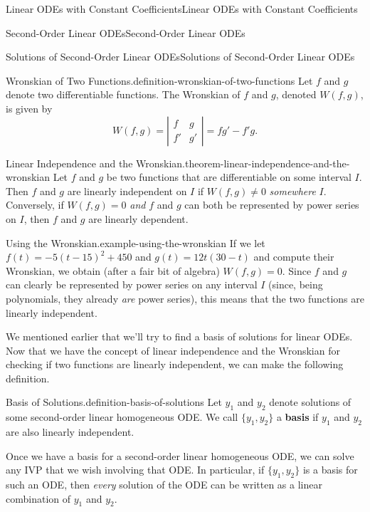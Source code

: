 \documentclass[10pt,]{book}
\newcommand{\terminology}[1]{\textbf{#1}}
\numberwithin{equation}{section}
\newcommand{\amp}{&}
\begin{document}
\begin{chapterptx}{Linear ODEs with Constant Coefficients}{}{Linear ODEs with Constant Coefficients}{}{}
\begin{sectionptx}{Second-Order Linear ODEs}{}{Second-Order Linear ODEs}{}{}
\begin{subsectionptx}{Solutions of Second-Order Linear ODEs}{}{Solutions of Second-Order Linear ODEs}{}{}
\begin{definition}{Wronskian of Two Functions.}{definition-wronskian-of-two-functions}%
\hypertarget{p-169}{}%
Let \(f\) and \(g\) denote two differentiable functions. The Wronskian of \(f\) and \(g\), denoted \(W(f,g)\), is given by%
\begin{equation*}
W(f,g) = \left|\begin{matrix} f \amp g \\ f' \amp g' \end{matrix}\right| = fg' - f'g.
\end{equation*}
%
\end{definition}
\begin{theorem}{Linear Independence and the Wronskian.}{}{theorem-linear-independence-and-the-wronskian}%
\hypertarget{p-170}{}%
Let \(f\) and \(g\) be two functions that are differentiable on some interval \(I\). Then \(f\) and \(g\) are linearly independent on \(I\) if \(W(f,g) \neq 0\) \emph{somewhere} \(I\). Conversely, if \(W(f,g) = 0\) \emph{and} \(f\) and \(g\) can both be represented by power series on \(I\), then \(f\) and \(g\) are linearly dependent.%
\end{theorem}
\begin{example}{Using the Wronskian.}{example-using-the-wronskian}%
\hypertarget{p-171}{}%
If we let \(f(t) = -5(t-15)^{2} + 450\) and \(g(t) = 12t(30-t)\) and compute their Wronskian, we obtain (after a fair bit of algebra) \(W(f,g) = 0\). Since \(f\) and \(g\) can clearly be represented by power series on any interval \(I\) (since, being polynomials, they already \emph{are} power series), this means that the two functions are linearly independent.%
\end{example}
\hypertarget{p-172}{}%
We mentioned earlier that we'll try to find a basis of solutions for linear ODEs. Now that we have the concept of linear independence and the Wronskian for checking if two functions are linearly independent, we can make the following definition.%
\begin{definition}{Basis of Solutions.}{definition-basis-of-solutions}%
\hypertarget{p-173}{}%
Let \(y_{1}\) and \(y_{2}\) denote solutions of some second-order linear homogeneous ODE. We call \(\{y_{1},y_{2}\}\) a \terminology{basis} if \(y_{1}\) and \(y_{2}\) are also linearly independent.%
\end{definition}
\hypertarget{p-174}{}%
Once we have a basis for a second-order linear homogeneous ODE, we can solve any IVP that we wish involving that ODE. In particular, if \(\{y_{1},y_{2}\}\) is a basis for such an ODE, then \emph{every} solution of the ODE can be written as a linear combination of \(y_{1}\) and \(y_{2}\).%

\end{subsectionptx}
\end{sectionptx}
\end{chapterptx}
\end{document}
